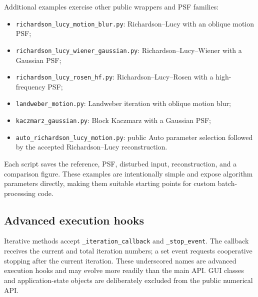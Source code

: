 \documentclass[10pt,a4paper]{article}
\newcommand{\code}[1]{\texttt{#1}}
\begin{document}
Additional examples exercise other public wrappers and PSF families:
\begin{itemize}
\item \code{richardson\_lucy\_motion\_blur.py}: Richardson--Lucy with an oblique motion PSF;
\item \code{richardson\_lucy\_wiener\_gaussian.py}: Richardson--Lucy--Wiener with a Gaussian PSF;
\item \code{richardson\_lucy\_rosen\_hf.py}: Richardson--Lucy--Rosen with a high-frequency PSF;
\item \code{landweber\_motion.py}: Landweber iteration with oblique motion blur;
\item \code{kaczmarz\_gaussian.py}: Block Kaczmarz with a Gaussian PSF;
\item \code{auto\_richardson\_lucy\_motion.py}: public Auto parameter selection followed by the accepted Richardson--Lucy reconstruction.
\end{itemize}
Each script saves the reference, PSF, disturbed input, reconstruction, and a comparison figure.  These examples are intentionally simple and expose algorithm parameters directly, making them suitable starting points for custom batch-processing code.


\subsection{Advanced execution hooks}
Iterative methods accept \code{\_iteration\_callback} and \code{\_stop\_event}.  The callback receives the current and total iteration numbers; a set event requests cooperative stopping after the current iteration.  These underscored names are advanced execution hooks and may evolve more readily than the main API.  GUI classes and application-state objects are deliberately excluded from the public numerical API.
\end{document}
